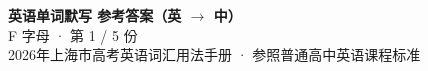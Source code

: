 \documentclass[10pt,a4paper]{article}
\begin{document}
\pagestyle{plain}

\begin{center}
{\LARGE\bfseries 英语单词默写 \quad 参考答案（英 $\to$ 中）}\\[0.22em]
{\large F 字母 · 第 1 / 5 份}\\[0.18em]
{\small 2026年上海市高考英语词汇用法手册 · 参照普通高中英语课程标准}
\end{center}

\vspace{0.2em}
\noindent{\color{rulegray}\rule{\textwidth}{0.8pt}}

\vspace{0.35em}

\vspace{0.25em}
\renewcommand{\arraystretch}{1.32}
\end{document}
